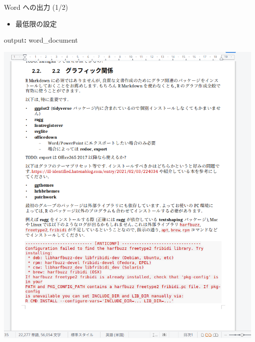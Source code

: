 \documentclass[
  ignorenonframetext,
]{beamer}
\newenvironment{Shaded}{\begin{snugshade}}{\end{snugshade}}
\newcommand{\AttributeTok}[1]{\textcolor[rgb]{0.77,0.63,0.00}{#1}}
\newcommand{\FunctionTok}[1]{\textcolor[rgb]{0.00,0.00,0.00}{#1}}
\newcommand{\KeywordTok}[1]{\textcolor[rgb]{0.13,0.29,0.53}{\textbf{#1}}}
\providecommand{\tightlist}{%
  \setlength{\itemsep}{0pt}\setlength{\parskip}{0pt}}
\begin{document}
\begin{frame}[fragile]{Word への出力 (1/2)}
\protect\hypertarget{word-ux3078ux306eux51faux529b-12}{}
\begin{itemize}
\tightlist
\item
  最低限の設定
\end{itemize}

\begin{Shaded}
\begin{Highlighting}[]
\FunctionTok{output}\KeywordTok{:}\AttributeTok{ word\_document}
\end{Highlighting}
\end{Shaded}

\begin{center}\includegraphics[width=1\linewidth,height=1\textheight,keepaspectratio]{img/libre} \end{center}
\end{frame}
\end{document}

